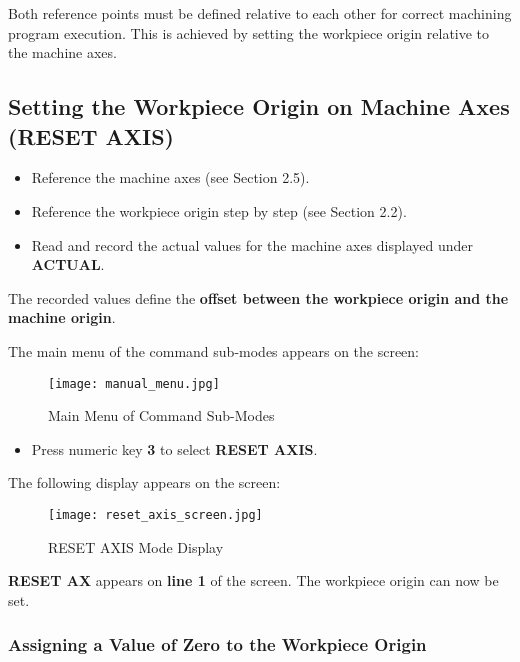Both reference points must be defined relative to each other for correct machining program execution. This is achieved by setting the workpiece origin relative to the machine axes.

\subsection{Setting the Workpiece Origin on Machine Axes (RESET AXIS)}

\begin{itemize}
    \item Reference the machine axes (see Section 2.5).
    \item Reference the workpiece origin step by step (see Section 2.2).
    \item Read and record the actual values for the machine axes displayed under \textbf{ACTUAL}.
\end{itemize}

The recorded values define the \textbf{offset between the workpiece origin and the machine origin}.


\begin{itemize}
\end{itemize}

The main menu of the command sub-modes appears on the screen:

\begin{figure}[h]
    \centering
    \texttt{[image: manual\_menu.jpg]}
    \caption{Main Menu of Command Sub-Modes}
\end{figure}

\newpage

\begin{itemize}
    \item Press numeric key \textbf{3} to select \textbf{RESET AXIS}.
\end{itemize}

The following display appears on the screen:

\begin{figure}[h]
    \centering
    \texttt{[image: reset\_axis\_screen.jpg]}
    \caption{RESET AXIS Mode Display}
\end{figure}

\textbf{RESET AX} appears on \textbf{line 1} of the screen. The workpiece origin can now be set.

\subsubsection*{Assigning a Value of Zero to the Workpiece Origin}

